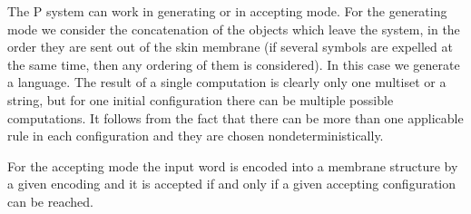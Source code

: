 The P system can work in generating or in accepting mode. For the generating mode we consider the concatenation of the objects which leave the system, in the order they are sent out of the skin membrane (if several symbols are expelled at the same time, then any ordering of them is considered). In this case we generate a language. The result of a single computation is clearly only one multiset or a string, but for one initial configuration there can be multiple possible computations. It follows from the fact that there can be more than one applicable rule in each configuration and they are chosen nondeterministically.

For the accepting mode the input word is encoded into a membrane structure by a given encoding and it is accepted if and only if a given accepting configuration can be reached\cite{Ibarra05Active}.
